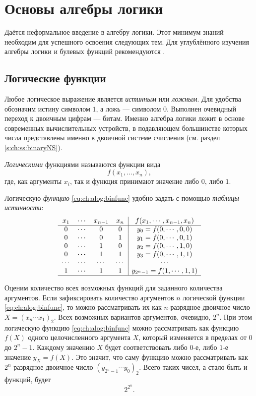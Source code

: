 \chapter{Основы алгебры логики}
\label{ch:alog}

Даётся неформальное введение в алгебру логики. Этот минимум знаний необходим для успешного освоения следующих тем. Для углублённого изучения алгебры логики и булевых функций рекомендуются \cite{bib:yablonsky:discreteintro,bib:novic:discrmathprogrammer}.

\section{Логические функции}

Любое логическое выражение является \emph{истинным} или \emph{ложным}. Для удобства обозначим истину символом $1$, а ложь --- символом $0$. Выполнен очевидный переход к двоичным цифрам --- битам. Именно алгебра логики лежит в основе современных вычислительных устройств, в подавляющем большинстве которых числа представлены именно в двоичной системе счисления (см. раздел \ref{s:ch:ss:binaryNS}). 

\emph{Логическими} функциями называются функции вида 
    \begin{equation}
        \label{eq:ch:alog:binfunc}
        f(x_1,\ldots,x_n),
    \end{equation}
где, как аргументы $x_i$, так и функция принимают значение либо $0$, либо $1$.

Логическую \emph{функцию} \eqref{eq:ch:alog:binfunc} удобно задать с помощью \emph{таблицы истинности}:
\[
    \begin{array}{cccc|c}
        x_1 &\cdots&x_{n-1} &x_n&f(x_1,\cdots,x_{n-1},x_n)\\
        \hline
        0   &\cdots&0       &0  &y_0=f(0,\cdots,0,0)\\
        0   &\cdots&0       &1  &y_1=f(0,\cdots,0,1)\\
        0   &\cdots&1       &0  &y_2=f(0,\cdots,1,0)\\
        0   &\cdots&1       &1  &y_3=f(0,\cdots,1,1)\\
        \cdots   &\cdots&\cdots       &\cdots  &\cdots\\
        1   &\cdots&1       &1  &y_{2^n-1}=f(1,\cdots,1,1)\\
        \hline
    \end{array}
\]

Оценим количество всех возможных функций для заданного количества аргументов. Если зафиксировать количество аргументов $n$ логической функции \eqref{eq:ch:alog:binfunc}, то можно рассматривать их как $n$-разрядное двоичное число $X=(x_n\cdots x_1)_2$. Всех возможных вариантов аргументов, очевидно, $2^n$. При этом логическую функцию \eqref{eq:ch:alog:binfunc} можно рассматривать как функцию $f(X)$ одного целочисленного аргумента $X$, который изменяется в пределах от $0$ до $2^n-1$. Каждому значению $X$ будет соответствовать  либо $0$-е, либо $1$-е значение $y_X=f(X)$. Это значит, что саму функцию можно рассматривать как $2^n$-разрядное двоичное число $(y_{2^n-1}\cdots y_0)_2$. Всего таких чисел, а стало быть и функций, будет
\[
    2^{2^{n}}.
\]

